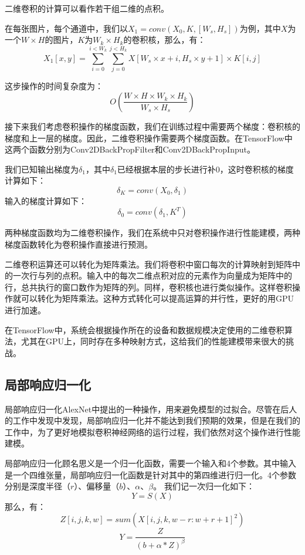     二维卷积的计算可以看作若干组二维的点积。
    
    在每张图片，每个通道中，我们以$ X_1 = conv(X_0, K, [W_s, H_s]) $为例，其中$ X $为一个$ W \times H $的图片，$ K $为$ W_k \times H_k $的卷积核，那么，有：
    $$
        X_1[x, y] = \sum_{i=0}^{i < W_k}\sum_{j=0}^{j < H_k}X[W_s \times x + i, H_s \times y + 1] \times K[i, j]
    $$
    
    这步操作的时间复杂度为：
    $$
        O\left(\frac{W \times H \times W_k \times H_k}{W_s \times H_s}\right)
    $$

    接下来我们考虑卷积操作的梯度函数，我们在训练过程中需要两个梯度：卷积核的梯度和上一层的梯度。因此，二维卷积操作需要两个梯度函数。在TensorFlow中这两个函数分别为Conv2DBackPropFilter和Conv2DBackPropInput。
    
    我们已知输出梯度为$ \delta_1 $，其中$ \delta_1 $已经根据本层的步长进行补0，这时卷积核的梯度计算如下：
    $$
        \delta_K = conv(X_0, \delta_1)
    $$
    输入的梯度计算如下：
    $$
        \delta_0 = conv(\delta_1, K^T)
    $$
    
    两种梯度函数均为二维卷积操作，我们在系统中只对卷积操作进行性能建模，两种梯度函数转化为卷积操作直接进行预测。
    
    二维卷积运算还可以转化为矩阵乘法\cite{im2col}。我们将卷积中窗口每次的计算映射到矩阵中的一次行与列的点积。输入中的每次二维点积对应的元素作为向量成为矩阵中的行，总共执行的窗口数作为矩阵的列。同样，卷积核也进行类似操作。这样卷积操作就可以转化为矩阵乘法。这种方式转化可以提高运算的并行性，更好的用GPU进行加速。
    
    在TensorFlow中，系统会根据操作所在的设备和数据规模决定使用的二维卷积算法，尤其在GPU上，同时存在多种映射方式，这给我们的性能建模带来很大的挑战。


\subsection{局部响应归一化}
    局部响应归一化AlexNet中提出的一种操作，用来避免模型的过拟合。尽管在后人的工作\cite{vggnet}中发现中发现，局部响应归一化并不能达到我们预期的效果，但是在我们的工作中，为了更好地模拟卷积神经网络的运行过程，我们依然对这个操作进行性能建模。
    
    局部响应归一化顾名思义是一个归一化函数，需要一个输入和4个参数。其中输入是一个四维张量，局部响应归一化函数是针对其中的第四维进行归一化。4个参数分别是深度半径（$ r $）、偏移量（$ b $）、$ \alpha $、$ \beta $。
    我们记一次归一化如下：
    $$
        Y = S(X)
    $$
    那么，有：
    $$
        Z[i, j, k, w] = sum(X[i, j, k, w-r: w+r+1]^2)
    $$
    $$
        Y = \frac{Z}{(b + \alpha * Z)^\beta}
    $$

